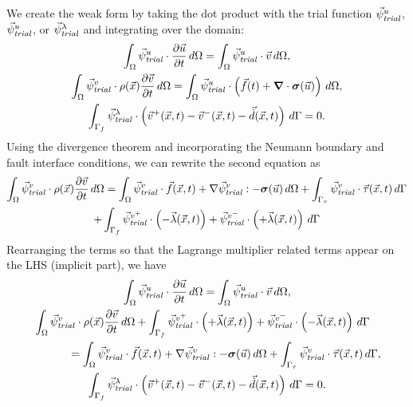 We create the weak form by taking the dot product with the trial
function $\trialvec[u]$, $\trialvec[u]$, or $\trialvec[\lambda]$ and
integrating over the domain:
\begin{gather}
  \int_\Omega \trialvec[u] \cdot \frac{\partial \vec{u}}{\partial t} \, d\Omega = 
  \int_\Omega \trialvec[u] \cdot \vec{v} \, d\Omega, \\
    \int_\Omega \trialvec[v] \cdot \rho(\vec{x}) \frac{\partial \vec{v}}{\partial t} \, d\Omega 
 = \int_\Omega \trialvec[u] \cdot \left( \vec{f}(t) + \tensor{\nabla} \cdot \tensor{\sigma} (\vec{u}) \right) \, d\Omega, \\
  \int_{\Gamma_{f}} \trialvec[\lambda] \cdot \left(
    \vec{v}^+(\vec{x},t) - \vec{v}^-(\vec{x},t) - \vec{\dot{d}}(\vec{x},t) \right) \, d\Gamma = 0.
\end{gather}
Using the divergence theorem and incorporating the Neumann boundary and fault interface
conditions, we can rewrite the second equation as
\begin{multline}
% 
  \int_\Omega \trialvec[v] \cdot \rho(\vec{x}) \frac{\partial \vec{v}}{\partial t} \, d\Omega
  = \int_\Omega \trialvec[v] \cdot \vec{f}(\vec{x},t) + \nabla \trialvec[v] : -\tensor{\sigma}(\vec{u}) \, d\Omega
  + \int_{\Gamma_\tau} \trialvec[v] \cdot \vec{\tau}(\vec{x},t) \, d\Gamma\\
  + \int_{\Gamma_{f}} \trialvec[v^+] \cdot \left(-\vec{\lambda}(\vec{x},t)\right)
  + \trialvec[v^-] \cdot \left(+\vec{\lambda}(\vec{x},t)\right)\, d\Gamma
\end{multline}
Rearranging the terms so that the Lagrange multiplier related terms appear on the LHS (implicit part), we have
\begin{gather}
  \int_\Omega \trialvec[u] \cdot \frac{\partial \vec{u}}{\partial t} \, d\Omega = 
  \int_\Omega \trialvec[u] \cdot \vec{v} \, d\Omega, \\
  \begin{multlined}
  \int_\Omega \trialvec[v] \cdot \rho(\vec{x}) \frac{\partial \vec{v}}{\partial t} \, d\Omega
  + \int_{\Gamma_{f}} \trialvec[v^+] \cdot \left(+\vec{\lambda}(\vec{x},t)\right)
  + \trialvec[v^-] \cdot \left(-\vec{\lambda}(\vec{x},t)\right)\, d\Gamma \\
  = \int_\Omega \trialvec[v] \cdot \vec{f}(\vec{x},t) + \nabla \trialvec[v] : -\tensor{\sigma}(\vec{u}) \, d\Omega
  + \int_{\Gamma_\tau} \trialvec[v] \cdot \vec{\tau}(\vec{x},t) \, d\Gamma,
  \end{multlined}\\
  \int_{\Gamma_{f}} \trialvec[\lambda] \cdot \left(
    \vec{v}^+(\vec{x},t) - \vec{v}^-(\vec{x},t) - \vec{\dot{d}}(\vec{x},t) \right) \, d\Gamma = 0.
\end{gather}

